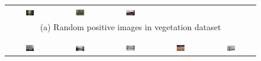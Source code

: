 \documentclass[10pt,journal,compsoc]{IEEEtran}
\begin{document}
\begin{figure}[th]
{{\begin{center}
\begin{tabular}{@{}c@{\,\,\,}c@{\,\,\,}c@{\,\,\,}c@{\,\,\,}c@{\,\,\,}}
\includegraphics[width=0.19\textwidth]{imggrid/datasetposi/8.jpg} &
\includegraphics[width=0.19\textwidth]{imggrid/datasetposi/9.jpg} &
\includegraphics[width=0.19\textwidth]{imggrid/datasetposi/10.jpg} \\
\multicolumn{5}{c}{(a) Random positive images in vegetation dataset} \\ 
\\[-6pt]
\hline
\\[-6pt]
\includegraphics[width=0.19\textwidth]{imggrid/datasetnega/1.jpg} &
\includegraphics[width=0.19\textwidth]{imggrid/datasetnega/2.jpg} &
\includegraphics[width=0.19\textwidth]{imggrid/datasetnega/3.jpg} &
\includegraphics[width=0.19\textwidth]{imggrid/datasetnega/4.jpg} &
\includegraphics[width=0.19\textwidth]{imggrid/datasetnega/5.jpg} \\

\end{tabular}
\end{center}}}
\end{figure}
\end{document}
